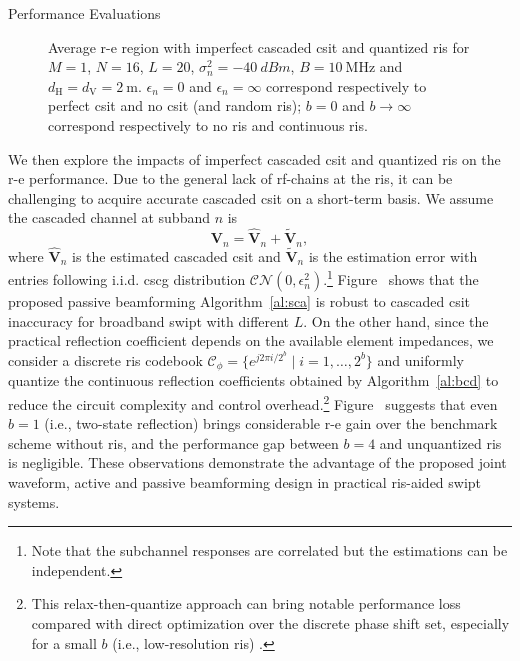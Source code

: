 \begin{section}{Performance Evaluations}
	\begin{figure}[!t]
		\centering
		\caption{Average \gls{r-e} region with imperfect cascaded \gls{csit} and quantized \gls{ris} for $M=1$, $N=16$, $L=20$, $\sigma_n^2=\qty{-40}{dBm}$, $B=\qty{10}{\MHz}$ and $d_{\mathrm{H}}=d_{\mathrm{V}}=\qty{2}{\meter}$. $\epsilon_{n}=0$ and $\epsilon_{n}=\infty$ correspond respectively to perfect \gls{csit} and no \gls{csit} (and random \gls{ris}); $b=0$ and $b \to \infty$ correspond respectively to no \gls{ris} and continuous \gls{ris}.}
	\end{figure}

	We then explore the impacts of imperfect cascaded \gls{csit} and quantized \gls{ris} on the \gls{r-e} performance. Due to the general lack of \gls{rf}-chains at the \gls{ris}, it can be challenging to acquire accurate cascaded \gls{csit} on a short-term basis. We assume the cascaded channel at subband $n$ is
	\begin{equation}
		\mathbf{V}_{n} = \hat{\mathbf{V}}_{n} + \tilde{\mathbf{V}}_{n},
	\end{equation}
	where $\hat{\mathbf{V}}_{n}$ is the estimated cascaded \gls{csit} and $\tilde{\mathbf{V}}_{n}$ is the estimation error with entries following i.i.d. \gls{cscg} distribution $\mathcal{CN}(0, \epsilon_{n}^2)$.\footnote{Note that the subchannel responses are correlated but the estimations can be independent.} Figure~ shows that the proposed passive beamforming Algorithm~\ref{al:sca} is robust to cascaded \gls{csit} inaccuracy for broadband \gls{swipt} with different $L$. On the other hand, since the practical reflection coefficient depends on the available element impedances, we consider a discrete \gls{ris} codebook $\mathcal{C}_\phi = \{e^{j 2 \pi i / 2^b} \mid i = 1, \dots, 2^b\}$ and uniformly quantize the continuous reflection coefficients obtained by Algorithm~\ref{al:bcd} to reduce the circuit complexity and control overhead.\footnote{This relax-then-quantize approach can bring notable performance loss compared with direct optimization over the discrete phase shift set, especially for a small $b$ (i.e., low-resolution \gls{ris}) \cite{Wu2020c}.} Figure~ suggests that even $b=1$ (i.e., two-state reflection) brings considerable \gls{r-e} gain over the benchmark scheme without \gls{ris}, and the performance gap between $b=4$ and unquantized \gls{ris} is negligible. These observations demonstrate the advantage of the proposed joint waveform, active and passive beamforming design in practical \gls{ris}-aided \gls{swipt} systems.
\end{section}


